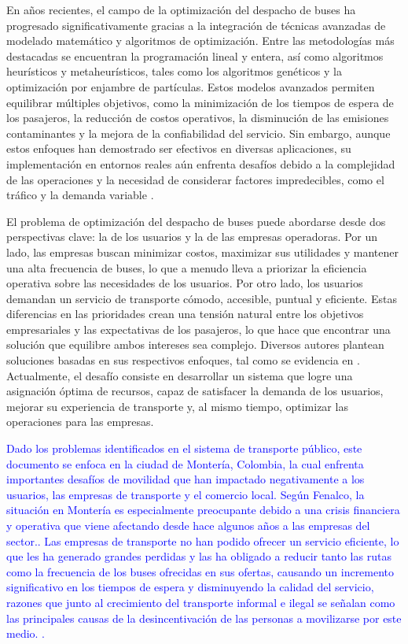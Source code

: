 \documentclass[preprint,11pt]{elsarticle}
\newcommand{\Blue}[1]{\textcolor{blue}{#1}}
\begin{document}
En años recientes, el campo de la optimización del despacho de buses ha progresado significativamente gracias a la integración de técnicas avanzadas de modelado matemático y algoritmos de optimización. Entre las metodologías más destacadas se encuentran la programación lineal y entera, así como algoritmos heurísticos y metaheurísticos, tales como los algoritmos genéticos y la optimización por enjambre de partículas. Estos modelos avanzados permiten equilibrar múltiples objetivos, como la minimización de los tiempos de espera de los pasajeros, la reducción de costos operativos, la disminución de las emisiones contaminantes y la mejora de la confiabilidad del servicio.\cite{cheng2024bus} Sin embargo, aunque estos enfoques han demostrado ser efectivos en diversas aplicaciones, su implementación en entornos reales aún enfrenta desafíos debido a la complejidad de las operaciones y la necesidad de considerar factores impredecibles, como el tráfico y la demanda variable \cite{fakhravar2022heuristics}.

El problema de optimización del despacho de buses puede abordarse desde dos perspectivas clave: la de los usuarios y la de las empresas operadoras. Por un lado, las empresas buscan minimizar costos, maximizar sus utilidades y mantener una alta frecuencia de buses, lo que a menudo lleva a priorizar la eficiencia operativa sobre las necesidades de los usuarios. Por otro lado, los usuarios demandan un servicio de transporte cómodo, accesible, puntual y eficiente. Estas diferencias en las prioridades crean una tensión natural entre los objetivos empresariales y las expectativas de los pasajeros, lo que hace que encontrar una solución que equilibre ambos intereses sea complejo. Diversos autores plantean soluciones basadas en sus respectivos enfoques, tal como se evidencia en \cite{guihaire2008}. Actualmente, el desafío consiste en desarrollar un sistema que logre una asignación óptima de recursos, capaz de satisfacer la demanda de los usuarios, mejorar su experiencia de transporte y, al mismo tiempo, optimizar las operaciones para las empresas.

\Blue{Dado los problemas identificados en el sistema de transporte público, este documento se enfoca en la ciudad de Montería, Colombia, la cual enfrenta importantes desafíos de movilidad que han impactado negativamente a los usuarios, las empresas de transporte y el comercio local. Según Fenalco, la situación en Montería es especialmente preocupante debido a una crisis financiera y operativa que viene afectando desde hace algunos años a las empresas del sector.\cite{fenalco2024transporte}. Las empresas de transporte no han podido ofrecer un servicio eficiente, lo que les ha generado grandes perdidas y las ha obligado a reducir tanto las rutas como la frecuencia de los buses ofrecidas en sus ofertas, causando un incremento significativo en los tiempos de espera y disminuyendo la calidad del servicio, razones que junto al crecimiento del transporte informal e ilegal se señalan como las principales causas de la desincentivación de las personas a movilizarse por este medio. \cite{ortiz2023transporte}.}
\end{document}
